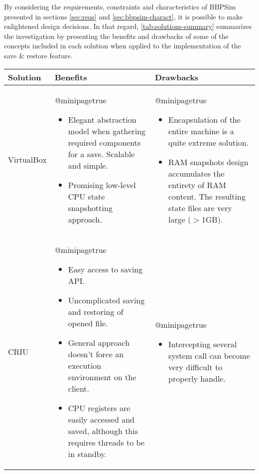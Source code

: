 {By considering the requirements, constraints and characteristics of \gls{BBPSim} presented in sections \ref{sec:reqs} and \ref{sec:bbpsim-charact}, it is possible to make enlightened design decisions. In that regard, \autoref{tab:solutions-summary} summarizes the investigation by presenting the benefits and drawbacks of some of the concepts included in each solution when applied to the implementation of the save \& restore feature.

\begin{table}[htbp]
	\centering
	\begin{tabularx}{\linewidth}{l X X}
		\toprule
		{\bfseries Solution} & {\bfseries\textcolor{benefitsheader}{Benefits}}& {\bfseries\textcolor{drawbacksheader}{Drawbacks}}\\
		\midrule
		VirtualBox &
		\csname @minipagetrue\endcsname 
		\begin{itemize}[leftmargin=*]
			\item Elegant abstraction model when gathering required components for a save. Scalable and simple.
			\item Promising low-level CPU state snapshotting approach.
		\end{itemize} & 
		\csname @minipagetrue\endcsname 
		\begin{itemize}[leftmargin=*]
			\item Encapsulation of the entire machine is a quite extreme solution.
			\item RAM snapshots design accumulates the entirety of RAM content. The resulting state files are very large ($>$1GB).
		\end{itemize}\\
		\midrule
		CRIU & 
		\csname @minipagetrue\endcsname 
		\begin{itemize}[leftmargin=*]
			\item Easy access to saving API.		
			\item Uncomplicated saving and restoring of opened file.
			\item General approach doesn't force an execution environment on the client. 
			\item CPU registers are easily accessed and saved, although this requires threads to be in standby.
		\end{itemize} & 
		\csname @minipagetrue\endcsname 
		\begin{itemize}[leftmargin=*]
			\item Intercepting several system call can become very difficult to properly handle.

\end{itemize}
\end{tabularx}
\end{table}}
